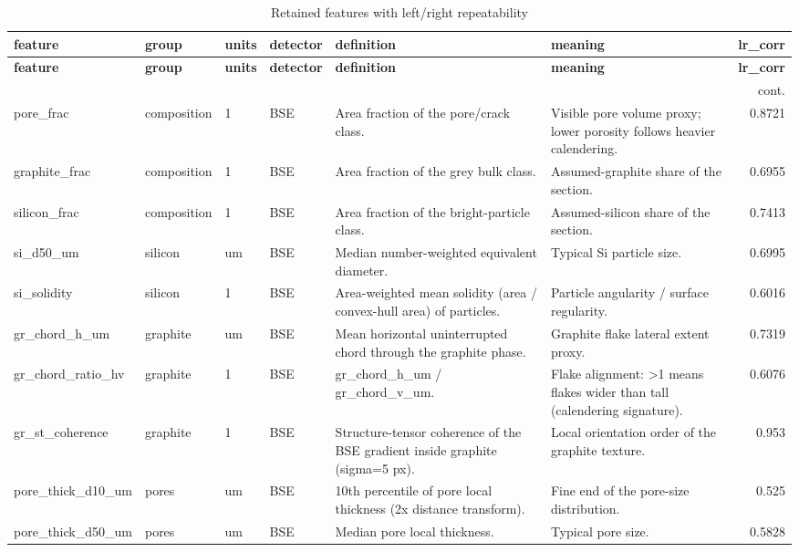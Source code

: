 \documentclass[11pt,a4paper]{article}
\begin{document}
\begin{longtable}{llllp{4.6cm}p{4.2cm}r}
\caption{Retained features with left/right repeatability}\label{tab:featdict}\\
\toprule
\textbf{feature} & \textbf{group} & \textbf{units} & \textbf{detector} & \textbf{definition} & \textbf{meaning} & \textbf{lr\_corr} \\
\midrule
\endfirsthead
\toprule \textbf{feature} & \textbf{group} & \textbf{units} & \textbf{detector} & \textbf{definition} & \textbf{meaning} & \textbf{lr\_corr} \\
\midrule
\endhead
\midrule\multicolumn{7}{r}{\footnotesize cont.}\\\midrule\endfoot
\bottomrule\endlastfoot
pore\_frac & composition & 1 & BSE & Area fraction of the pore/crack class. & Visible pore volume proxy; lower porosity follows heavier calendering. & 0.8721 \\
graphite\_frac & composition & 1 & BSE & Area fraction of the grey bulk class. & Assumed-graphite share of the section. & 0.6955 \\
silicon\_frac & composition & 1 & BSE & Area fraction of the bright-particle class. & Assumed-silicon share of the section. & 0.7413 \\
si\_d50\_um & silicon & um & BSE & Median number-weighted equivalent diameter. & Typical Si particle size. & 0.6995 \\
si\_solidity & silicon & 1 & BSE & Area-weighted mean solidity (area / convex-hull area) of particles. & Particle angularity / surface regularity. & 0.6016 \\
gr\_chord\_h\_um & graphite & um & BSE & Mean horizontal uninterrupted chord through the graphite phase. & Graphite flake lateral extent proxy. & 0.7319 \\
gr\_chord\_ratio\_hv & graphite & 1 & BSE & gr\_chord\_h\_um / gr\_chord\_v\_um. & Flake alignment: >1 means flakes wider than tall (calendering signature). & 0.6076 \\
gr\_st\_coherence & graphite & 1 & BSE & Structure-tensor coherence of the BSE gradient inside graphite (sigma=5 px). & Local orientation order of the graphite texture. & 0.953 \\
pore\_thick\_d10\_um & pores & um & BSE & 10th percentile of pore local thickness (2x distance transform). & Fine end of the pore-size distribution. & 0.525 \\
pore\_thick\_d50\_um & pores & um & BSE & Median pore local thickness. & Typical pore size. & 0.5828 \\

\end{longtable}
\end{document}
